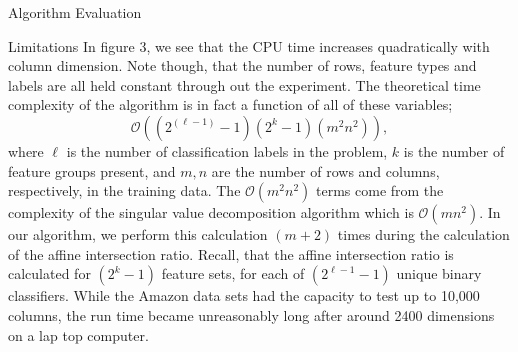 \documentclass{llncs}
\begin{document}
\begin{section}{Algorithm Evaluation}
\begin{subsection}{Limitations}
In figure 3, we see that the CPU time increases quadratically with column dimension. Note though, that the number of rows, feature types and labels are all held constant through out the experiment. The theoretical time complexity of the algorithm is in fact a function of all of these variables;
$$\mathcal{O}\left((2^{(\ell - 1)}-1)(2^k-1)(m^2n^2)\right),$$
where $\ell$ is the number of classification labels in the problem, $k$ is the number of feature groups present, and $m,n$ are the number of rows and columns, respectively, in the training data. The $\mathcal{O}(m^2n^2)$ terms come from the complexity of the singular value decomposition algorithm which is $\mathcal{O}(mn^2)$\cite{Tesic}. In our algorithm, we perform this calculation $(m + 2)$ times during the calculation of the affine intersection ratio. Recall, that the affine intersection ratio is calculated for $(2^k -1)$ feature sets, for each of $(2^{\ell -1} - 1)$ unique binary classifiers. While the Amazon data sets had the capacity to test up to 10,000 columns, the run time became unreasonably long after around 2400 dimensions on a lap top computer.
\end{subsection}


\end{section}
\end{document}
